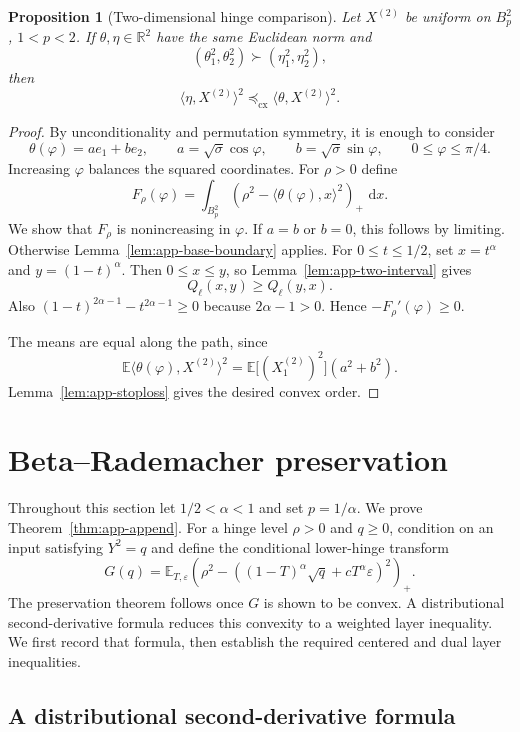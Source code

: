\documentclass[pdflatex,sn-mathphys-num]{sn-jnl}
\numberwithin{equation}{section}
\theoremstyle{thmstyleone}
\newtheorem{proposition}[theorem]{Proposition}
\theoremstyle{thmstylethree}
\newcommand{\R}{\mathbb{R}}
\newcommand{\E}{\mathbb{E}}
\newcommand{\1}{\mathbf{1}}
\newcommand{\dd}{\,\mathrm{d}}
\newcommand{\eps}{\varepsilon}
\newcommand{\cx}{\preceq_{\mathrm{cx}}}
\begin{document}
\begin{proposition}[Two-dimensional hinge comparison]\label{prop:app-base2}
Let $X^{(2)}$ be uniform on $B_p^2$, $1<p<2$. If $\theta,\eta\in\R^2$ have the same Euclidean norm and
\[
 (\theta_1^2,\theta_2^2)\succ(\eta_1^2,\eta_2^2),
\]
then
\[
 \langle\eta,X^{(2)}\rangle^2\cx\langle\theta,X^{(2)}\rangle^2.
\]
\end{proposition}

\begin{proof}
By unconditionality and permutation symmetry, it is enough to consider
\[
 \theta(\varphi)=ae_1+be_2,
 \qquad
 a=\sqrt\sigma\cos\varphi,
 \qquad
 b=\sqrt\sigma\sin\varphi,
 \qquad
 0\le\varphi\le\pi/4.
\]
Increasing $\varphi$ balances the squared coordinates. For $\rho>0$ define
\[
 F_\rho(\varphi)=\int_{B_p^2}(\rho^2-\langle\theta(\varphi),x\rangle^2)_+\,\dd x.
\]
We show that $F_\rho$ is nonincreasing in $\varphi$. If $a=b$ or $b=0$, this follows by limiting. Otherwise Lemma~\ref{lem:app-base-boundary} applies. For $0\le t\le1/2$, set $x=t^\alpha$ and $y=(1-t)^\alpha$. Then $0\le x\le y$, so Lemma~\ref{lem:app-two-interval} gives
\[
 Q_\ell(x,y)\ge Q_\ell(y,x).
\]
Also $(1-t)^{2\alpha-1}-t^{2\alpha-1}\ge0$ because $2\alpha-1>0$. Hence $-F_\rho'(\varphi)\ge0$.

The means are equal along the path, since
\[
 \E\langle\theta(\varphi),X^{(2)}\rangle^2
 =\E\bigl[(X_1^{(2)})^2\bigr](a^2+b^2).
\]
Lemma~\ref{lem:app-stoploss} gives the desired convex order.
\end{proof}
\section{Beta--Rademacher preservation}\label{sec:preservation}

Throughout this section let $1/2<\alpha<1$ and set $p=1/\alpha$.
We prove Theorem~\ref{thm:app-append}. For a hinge level $\rho>0$ and
$q\ge0$, condition on an input satisfying $Y^2=q$ and define the
conditional lower-hinge transform
\[
 G(q)=\E_{T,\eps}\left(
 \rho^2-\left((1-T)^\alpha\sqrt q+cT^\alpha\eps\right)^2
 \right)_+.
\]
The preservation theorem follows once $G$ is shown to be convex. A
distributional second-derivative formula reduces this convexity to a
weighted layer inequality. We first record that formula, then establish
the required centered and dual layer inequalities.

\subsection{A distributional second-derivative formula}
\end{document}
